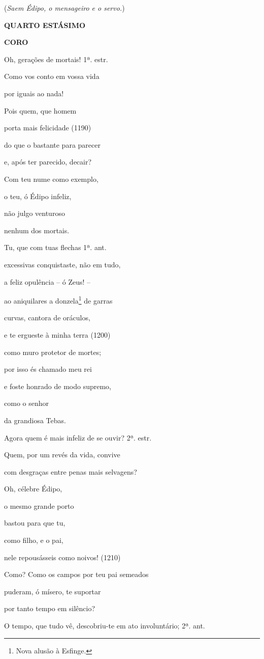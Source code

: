 (\emph{Saem Édipo, o mensageiro e o servo.})

\textbf{QUARTO ESTÁSIMO}

\textbf{CORO}

Oh, gerações de mortais! 1ª. estr.

Como vos conto em vossa vida

por iguais ao nada!

Pois quem, que homem

porta mais felicidade (1190)

do que o bastante para parecer

e, após ter parecido, decair?

Com teu nume como exemplo,

o teu, ó Édipo infeliz,

não julgo venturoso

nenhum dos mortais.

Tu, que com tuas flechas 1ª. ant.

excessivas conquistaste, não em tudo,

a feliz opulência -- ó Zeus! --

ao aniquilares a donzela\footnote{Nova alusão à Esfinge.} de garras

curvas, cantora de oráculos,

e te ergueste à minha terra (1200)

como muro protetor de mortes;

por isso és chamado meu rei

e foste honrado de modo supremo,

como o senhor

da grandiosa Tebas.

Agora quem é mais infeliz de se ouvir? 2ª. estr.

Quem, por um revés da vida, convive

com desgraças entre penas mais selvagens?

Oh, célebre Édipo,

o mesmo grande porto

bastou para que tu,

como filho, e o pai,

nele repousásseis como noivos! (1210)

Como? Como os campos por teu pai semeados

puderam, ó mísero, te suportar

por tanto tempo em silêncio?

O tempo, que tudo vê, descobriu-te em ato involuntário; 2ª. ant.

